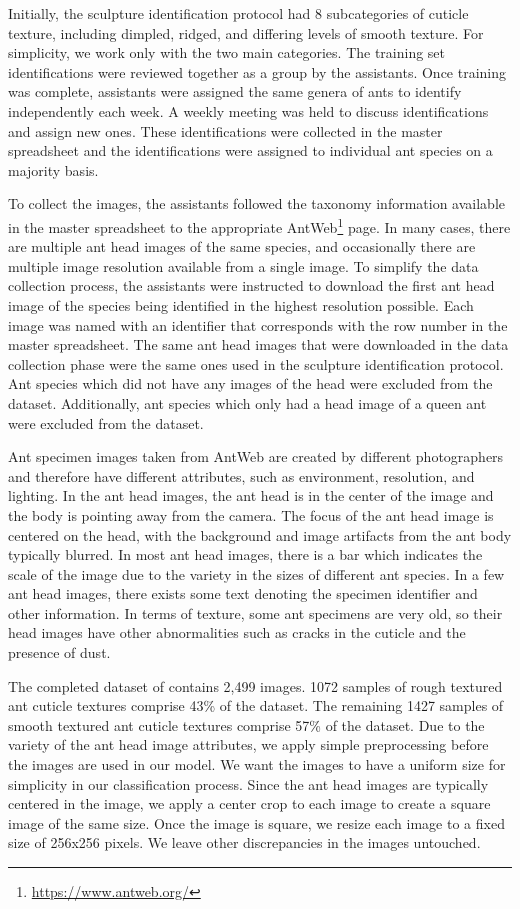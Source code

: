 \documentclass{aci}
\numberwithin{equation}{section}
\begin{document}
Initially, the sculpture identification protocol had 8 subcategories of cuticle
texture, including dimpled, ridged, and differing levels of smooth texture. For
simplicity, we work only with the two main categories. The training set
identifications were reviewed together as a group by the assistants. Once
training was complete, assistants were assigned the same genera of ants to
identify independently each week. A weekly meeting was held to discuss
identifications and assign new ones. These identifications were collected in the
master spreadsheet and the identifications were assigned to individual ant
species on a majority basis.

To collect the images, the assistants followed the taxonomy information
available in the master spreadsheet to the appropriate
AntWeb\footnote{\url{https://www.antweb.org/}} page. In many cases, there are
multiple ant head images of the same species, and occasionally there are
multiple image resolution available from a single image. To simplify the data
collection process, the assistants were instructed to download the first ant
head image of the species being identified in the highest resolution possible.
Each image was named with an identifier that corresponds with the row number in
the master spreadsheet. The same ant head images that were downloaded in the
data collection phase were the same ones used in the sculpture identification
protocol. Ant species which did not have any images of the head were excluded
from the dataset. Additionally, ant species which only had a head image of a
queen ant were excluded from the dataset.

Ant specimen images taken from AntWeb \cite{perrichot_antweb_2012} are created
by different photographers and therefore have different attributes, such as
environment, resolution, and lighting. In the ant head images, the ant head is
in the center of the image and the body is pointing away from the camera. The
focus of the ant head image is centered on the head, with the background and
image artifacts from the ant body typically blurred. In most ant head images,
there is a bar which indicates the scale of the image due to the variety in the
sizes of different ant species. In a few ant head images, there exists some text
denoting the specimen identifier and other information. In terms of texture,
some ant specimens are very old, so their head images have other abnormalities
such as cracks in the cuticle and the presence of dust.

The completed dataset of contains 2,499 images. 1072 samples of rough textured
ant cuticle textures comprise 43\% of the dataset. The remaining 1427 samples of
smooth textured ant cuticle textures comprise 57\% of the dataset. Due to the
variety of the ant head image attributes, we apply simple preprocessing before
the images are used in our model. We want the images to have a uniform size for
simplicity in our classification process. Since the ant head images are
typically centered in the image, we apply a center crop to each image to create
a square image of the same size. Once the image is square, we resize each image
to a fixed size of 256x256 pixels. We leave other discrepancies in the images
untouched.
\end{document}
